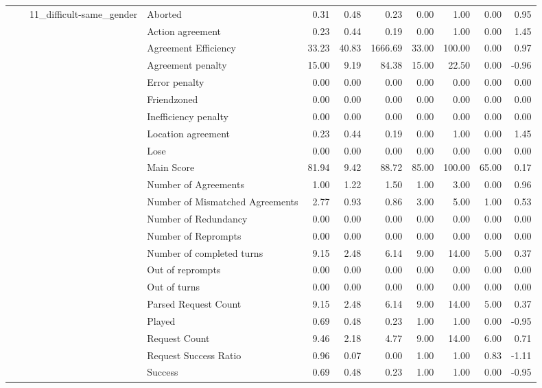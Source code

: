 \begin{tabular}{llllrrrrrrr}
\cline{3-11}
 &  & \multirow[t]{27}{*}{11_difficult-same_gender} & Aborted & 0.31 & 0.48 & 0.23 & 0.00 & 1.00 & 0.00 & 0.95 \\
 &  &  & Action agreement & 0.23 & 0.44 & 0.19 & 0.00 & 1.00 & 0.00 & 1.45 \\
 &  &  & Agreement Efficiency & 33.23 & 40.83 & 1666.69 & 33.00 & 100.00 & 0.00 & 0.97 \\
 &  &  & Agreement penalty & 15.00 & 9.19 & 84.38 & 15.00 & 22.50 & 0.00 & -0.96 \\
 &  &  & Error penalty & 0.00 & 0.00 & 0.00 & 0.00 & 0.00 & 0.00 & 0.00 \\
 &  &  & Friendzoned & 0.00 & 0.00 & 0.00 & 0.00 & 0.00 & 0.00 & 0.00 \\
 &  &  & Inefficiency penalty & 0.00 & 0.00 & 0.00 & 0.00 & 0.00 & 0.00 & 0.00 \\
 &  &  & Location agreement & 0.23 & 0.44 & 0.19 & 0.00 & 1.00 & 0.00 & 1.45 \\
 &  &  & Lose & 0.00 & 0.00 & 0.00 & 0.00 & 0.00 & 0.00 & 0.00 \\
 &  &  & Main Score & 81.94 & 9.42 & 88.72 & 85.00 & 100.00 & 65.00 & 0.17 \\
 &  &  & Number of Agreements & 1.00 & 1.22 & 1.50 & 1.00 & 3.00 & 0.00 & 0.96 \\
 &  &  & Number of Mismatched Agreements & 2.77 & 0.93 & 0.86 & 3.00 & 5.00 & 1.00 & 0.53 \\
 &  &  & Number of Redundancy & 0.00 & 0.00 & 0.00 & 0.00 & 0.00 & 0.00 & 0.00 \\
 &  &  & Number of Reprompts & 0.00 & 0.00 & 0.00 & 0.00 & 0.00 & 0.00 & 0.00 \\
 &  &  & Number of completed turns & 9.15 & 2.48 & 6.14 & 9.00 & 14.00 & 5.00 & 0.37 \\
 &  &  & Out of reprompts & 0.00 & 0.00 & 0.00 & 0.00 & 0.00 & 0.00 & 0.00 \\
 &  &  & Out of turns & 0.00 & 0.00 & 0.00 & 0.00 & 0.00 & 0.00 & 0.00 \\
 &  &  & Parsed Request Count & 9.15 & 2.48 & 6.14 & 9.00 & 14.00 & 5.00 & 0.37 \\
 &  &  & Played & 0.69 & 0.48 & 0.23 & 1.00 & 1.00 & 0.00 & -0.95 \\
 &  &  & Request Count & 9.46 & 2.18 & 4.77 & 9.00 & 14.00 & 6.00 & 0.71 \\
 &  &  & Request Success Ratio & 0.96 & 0.07 & 0.00 & 1.00 & 1.00 & 0.83 & -1.11 \\
 &  &  & Success & 0.69 & 0.48 & 0.23 & 1.00 & 1.00 & 0.00 & -0.95 \\

\end{tabular}
